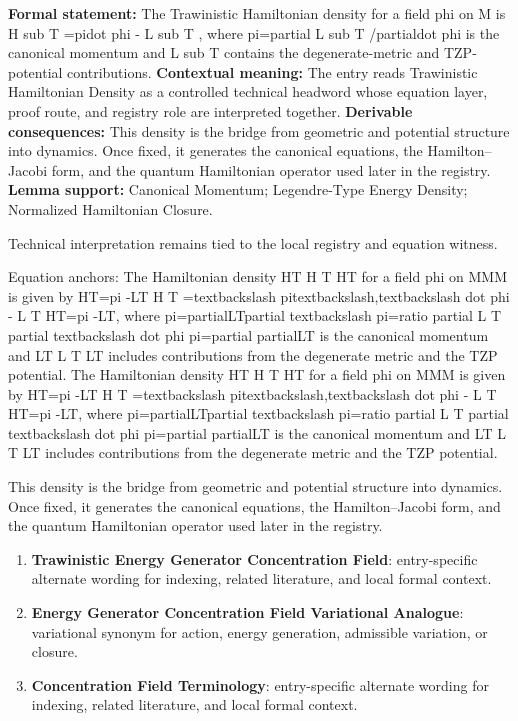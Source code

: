 \begingroup\footnotesize\setlength{\emergencystretch}{3em}\sloppy
\textbf{Formal statement:} The Trawinistic Hamiltonian density for a field phi on M is H sub T =pidot phi - L sub T , where pi=partial L sub T /partialdot phi is the canonical momentum and L sub T contains the degenerate-metric and TZP-potential contributions. \textbf{Contextual meaning:} The entry reads Trawinistic Hamiltonian Density as a controlled technical headword whose equation layer, proof route, and registry role are interpreted together. \textbf{Derivable consequences:} This density is the bridge from geometric and potential structure into dynamics. Once fixed, it generates the canonical equations, the Hamilton--Jacobi form, and the quantum Hamiltonian operator used later in the registry. \textbf{Lemma support:} Canonical Momentum; Legendre-Type Energy Density; Normalized Hamiltonian Closure.\par
\endgroup

Technical interpretation remains tied to the local registry and equation witness.

Equation anchors: The Hamiltonian density HT H T HT for a field  phi  on MMM is given by HT=pi    -LT H T =textbackslash pitextbackslash,textbackslash dot phi - L T HT=pi   -LT, where pi=partialLTpartial   textbackslash pi=ratio partial L T partial textbackslash dot phi pi=partial   partialLT is the canonical momentum and LT L T LT includes contributions from the degenerate metric and the TZP potential. The Hamiltonian density HT H T HT for a field  phi  on MMM is given by HT=pi    -LT H T =textbackslash pitextbackslash,textbackslash dot phi - L T HT=pi   -LT, where pi=partialLTpartial   textbackslash pi=ratio partial L T partial textbackslash dot phi pi=partial   partialLT is the canonical momentum and LT L T LT includes contributions from the degenerate metric and the TZP potential.

This density is the bridge from geometric and potential structure into dynamics. Once fixed, it generates the canonical equations, the Hamilton--Jacobi form, and the quantum Hamiltonian operator used later in the registry.
\endgroup

\begingroup\footnotesize\sloppy
\begin{enumerate}[leftmargin=1.35em,itemsep=1pt,topsep=1pt,parsep=0pt]
\item \textbf{Trawinistic Energy Generator Concentration Field}: entry-specific alternate wording for indexing, related literature, and local formal context.
\item \textbf{Energy Generator Concentration Field Variational Analogue}: variational synonym for action, energy generation, admissible variation, or closure.
\item \textbf{Concentration Field Terminology}: entry-specific alternate wording for indexing, related literature, and local formal context.
\end{enumerate}
\endgroup

